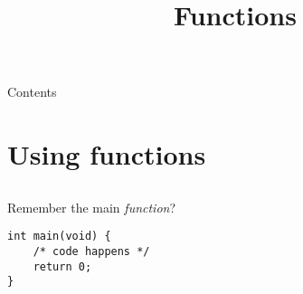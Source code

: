 
\newcommand {\topic}{
    Functions
}
\usepackage{tikz}
\usepackage[absolute,overlay]{textpos}

\setlength{\TPHorizModule}{1cm}
\setlength{\TPVertModule}{1cm}


\title{\topic}
\supertitle{\course}
\date{}



\maketitle

\begin{frame}{Contents}
    \tableofcontents
\end{frame}

\section{Using functions}
\subsection{}

\begin{frame}[fragile]{Remember the main \textit{function}?}
	\begin{lstlisting}
int main(void) {
	/* code happens */
	return 0;
}
\end{lstlisting}
\end{frame}

